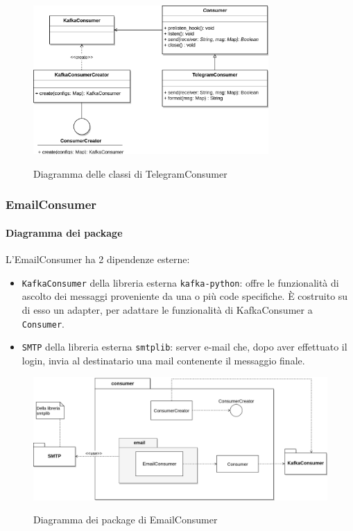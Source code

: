 \begin{figure}[H]
    \centering
    \includegraphics[width=0.8\textwidth]{img/Consumers-TelegramConsumer.png}\\
    \caption{Diagramma delle classi di TelegramConsumer}
\end{figure}


\subsubsection{EmailConsumer}
\paragraph{Diagramma dei package}

L'EmailConsumer ha 2 dipendenze esterne:
\begin{itemize}
    \item \texttt{KafkaConsumer} della libreria esterna \texttt{kafka-python}: offre le funzionalità di ascolto dei messaggi
        proveniente da una o più code specifiche. È costruito su di esso un adapter, per adattare le funzionalità di KafkaConsumer a
        \texttt{Consumer}.
    \item \texttt{SMTP} della libreria esterna \texttt{smtplib}: server e-mail che, dopo aver effettuato il login,
        invia al destinatario una mail contenente il messaggio finale.
\end{itemize}

\begin{figure}[H]
    \centering
    \includegraphics[width=\textwidth]{img/Package-EmailConsumer.png}\\
    \caption{Diagramma dei package di EmailConsumer}
\end{figure}


